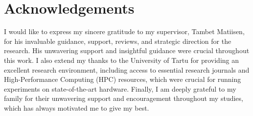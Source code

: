 \section{Acknowledgements} \label{Acknowledgements}

I would like to express my sincere gratitude to my supervisor, Tambet Matiisen, for his invaluable guidance, support, reviews, and strategic direction for the research. His unwavering support and insightful guidance were crucial throughout this work. I also extend my thanks to the University of Tartu for providing an excellent research environment, including access to essential research journals and High-Performance Computing (HPC) resources, which were crucial for running experiments on state-of-the-art hardware. Finally, I am deeply grateful to my family for their unwavering support and encouragement throughout my studies, which has always motivated me to give my best.